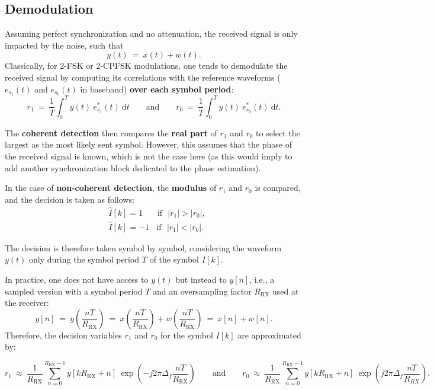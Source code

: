 \subsection{Demodulation}
Assuming perfect synchronization and no attenuation, the received signal is only impacted by the noise, such that
\begin{equation*}
    y(t)\:=\:x(t) + w(t).
\end{equation*}
Classically, for 2-FSK or 2-CPFSK modulations, one tends to demodulate the received signal by computing its correlations with the reference waveforms ($e_{s_1}(t)$ and $e_{s_0}(t)$ in baseband) \textbf{over each symbol period}:
\begin{equation*}
    r_1\:=\:\frac{1}{T}\int_0^T y(t)\:e_{s_1}^*(t) \:\text{d}t\qquad \text{and} \qquad r_0\:=\:\frac{1}{T}\int_0^T y(t)\:e_{s_0}^*(t) \:\text{d}t.
\end{equation*}

The \textbf{coherent detection} then compares the \textbf{real part} of $r_1$ and $r_0$ to select the largest as the most likely sent symbol. However, this assumes that the phase of the received signal is known, which is not the case here (as this would imply to add another synchronization block dedicated to the phase estimation).

In the case of \textbf{non-coherent detection}, the \textbf{modulus} of $r_1$ and $r_0$ is compared, and the decision is taken as follows:
\begin{align*}
    &\hat{I}[k]=1 \: \:\:\:\:\:\:\:\text{if}\:\:\: |r_1| > |r_0|,\\
    &\hat{I}[k]=-1 \:\: \:\:\text{if}\:\:\: |r_1| < |r_0|.
\end{align*}

The decision is therefore taken symbol by symbol, considering the waveform $y(t)$ only during the symbol period $T$ of the symbol $I[k]$.

In practice, one does not have access to $y(t)$ but instead to $y[n]$, i.e., a sampled version with a symbol period $T$ and an oversampling factor $R_{\text{RX}}$ used at the receiver:
\begin{equation*}
    y[n]\:=\:y\left(\frac{nT}{R_{\text{RX}}}\right)\:=\:x\left(\frac{nT}{R_{\text{RX}}}\right)+w\left(\frac{nT}{R_{\text{RX}}}\right)\:=\: x[n] + w[n].
\end{equation*}
Therefore, the decision variables $r_1$ and $r_0$ for the symbol $I[k]$ are approximated by:
\begin{small}
\begin{equation*}
    r_1\:\approx\:\frac{1}{R_{\text{RX}}}\sum_{n=0}^{R_{\text{RX}}-1} y[kR_{\text{RX}}+n] \:\exp \left(-j2\pi \Delta_f \frac{nT}{R_{\text{RX}}}\right)\qquad \text{and} \qquad r_0\:\approx\:\frac{1}{R_{\text{RX}}}\sum_{n=0}^{R_{\text{RX}}-1} y[kR_{\text{RX}}+n] \:\exp \left(j2\pi \Delta_f \frac{nT}{R_{RX}}\right).
\end{equation*}
\end{small}

